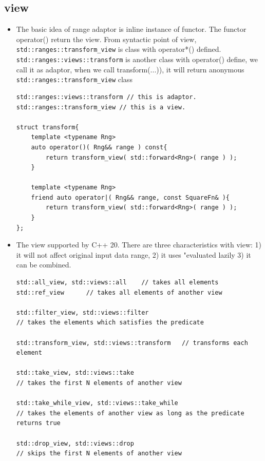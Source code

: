 \documentclass[a4paper,11pt,twoside]{book}
\begin{document}
\subsection{view}
\begin{itemize}
\item The basic idea of range adaptor is inline instance of functor. The functor operator() return the view. 
From syntactic point of view,  \texttt{std::ranges::transform\_view} is class with operator*() defined. \texttt{std::ranges::views::transform} is another class with operator() define, we call it as adaptor, when we call transform(...)), it will return anonymous \texttt{std::ranges::transform\_view} class

\begin{lstlisting}
std::ranges::views::transform // this is adaptor.
std::ranges::transform_view // this is a view.
	
struct transform{
	template <typename Rng>
	auto operator()( Rng&& range ) const{
		return transform_view( std::forward<Rng>( range ) );
	}
	
	template <typename Rng>
	friend auto operator|( Rng&& range, const SquareFn& ){
		return transform_view( std::forward<Rng>( range ) );
	}
};
\end{lstlisting}


\item The view supported by C++ 20. There are three characteristics with view: 1) it will not affect original input data range, 2) it uses "evaluated lazily 3) it can be combined. 
\begin{lstlisting}
std::all_view, std::views::all    // takes all elements
std::ref_view      // takes all elements of another view

std::filter_view, std::views::filter         
// takes the elements which satisfies the predicate

std::transform_view, std::views::transform   // transforms each element

std::take_view, std::views::take             
// takes the first N elements of another view

std::take_while_view, std::views::take_while 
// takes the elements of another view as long as the predicate returns true

std::drop_view, std::views::drop             
// skips the first N elements of another view


\end{lstlisting}
\end{itemize}
\end{document}
